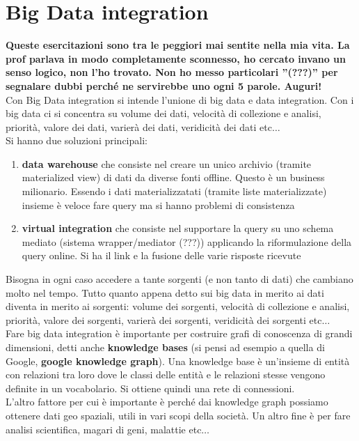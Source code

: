 \documentclass[a4paper,12pt, oneside]{book}
\begin{document}
\section{Big Data integration}
\textbf{Queste esercitazioni sono tra le peggiori mai sentite nella mia vita. La
prof parlava in modo completamente sconnesso, ho cercato invano un senso logico,
non l'ho trovato. Non ho messo particolari ''(???)'' per segnalare dubbi perché
ne servirebbe uno ogni 5 parole. Auguri!}\\
Con Big Data integration si intende l'unione di big data e data integration. Con
i big data ci si concentra su volume dei dati, velocità di collezione e analisi,
priorità, valore dei dati, varierà dei dati, veridicità dei dati etc$\ldots$\\
Si hanno due soluzioni principali:
\begin{enumerate}
  \item \textbf{data warehouse} che consiste nel creare un unico archivio
  (tramite materialized view) di dati da diverse fonti offline. Questo è un
  business milionario. Essendo i dati materializzatati (tramite liste
  materializzate) insieme è veloce fare query ma si hanno problemi di
  consistenza 
  \item \textbf{virtual integration} che consiste nel supportare la query su
  uno schema mediato (sistema wrapper/mediator (???)) applicando la
  riformulazione della query online. Si ha il link e la fusione delle varie
  risposte ricevute
\end{enumerate}
Bisogna in ogni caso accedere a tante sorgenti (e non tanto di dati) che
cambiano molto nel tempo. Tutto quanto appena detto sui big data in merito ai
dati diventa in merito ai sorgenti: volume dei sorgenti, velocità di collezione
e analisi, priorità, valore dei sorgenti, varierà dei sorgenti, veridicità dei
sorgenti etc$\ldots$\\ 
Fare big data integration è importante per costruire grafi di conoscenza di
grandi dimensioni, detti anche \textbf{knowledge bases} (si pensi ad esempio a
quella di Google, \textbf{google knowledge graph}). Una knowledge base è
un'insieme di entità con relazioni tra 
loro dove le classi delle entità e le relazioni stesse vengono definite in un
vocabolario. Si ottiene quindi una rete di connessioni.\\
L'altro fattore per cui è importante è perché dai knowledge graph possiamo
ottenere dati geo spaziali, utili in vari scopi della società. Un altro fine è
per fare analisi scientifica, magari di geni, malattie etc$\ldots$\\
\end{document}
